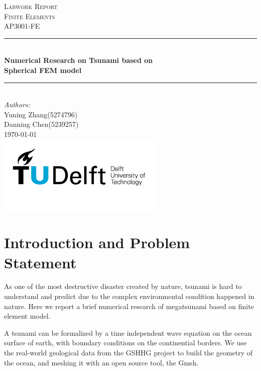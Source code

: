 \documentclass[a4paper]{article}
\begin{document}
\begin{titlepage}

\newcommand{\HRule}{\rule{\linewidth}{0.5mm}} 							%
\center 
 
\textsc{\LARGE Labwork Report}\\[1cm]

\textsc{\Large Finite Elements}\\[0.2cm]
\textsc{\large AP3001-FE}\\[1cm] 										%
\HRule \\[0.8cm]
{ \huge \bfseries Numerical Research on Tsunami based on} \\[0.5cm]
{ \huge \bfseries Spherical FEM model} \\[1cm]			%
\HRule \\[1.8cm]
\large
\emph{Authors:}\\[0.5cm]
Yuning Zhang(5274796)\\
Danning Chen(5239257)\\[1.5cm]						%
{\large \today}\\[5cm]
\includegraphics[width=0.6\textwidth]{images/TU_delft_logo.jpg}\\[1cm] 	%
\vfill 
\end{titlepage}


\section{Introduction and Problem Statement}

As one of the most destructive disaster created by nature, tsunami is hard to understand and predict due to 
the complex environmental condition happened in nature.
Here we report a brief numerical research of megatsunami based on finite element model.

A tsunami can be formalized by a time independent wave equation on the ocean surface of earth,
with boundary conditions on the continential borders. 
We use the real-world geological data from the GSHHG project \cite{wessel1996global} to build the geometry of the ocean, 
and meshing it with an open source tool, the Gmsh\cite{geuzaine2009gmsh}.%
\end{document}
